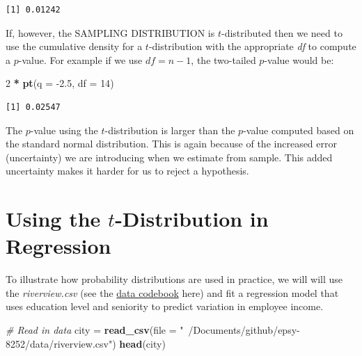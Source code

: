 \documentclass[]{book}
\newenvironment{Shaded}{\begin{snugshade}}{\end{snugshade}}
\newcommand{\CommentTok}[1]{\textcolor[rgb]{0.56,0.35,0.01}{\textit{#1}}}
\newcommand{\DataTypeTok}[1]{\textcolor[rgb]{0.13,0.29,0.53}{#1}}
\newcommand{\DecValTok}[1]{\textcolor[rgb]{0.00,0.00,0.81}{#1}}
\newcommand{\FloatTok}[1]{\textcolor[rgb]{0.00,0.00,0.81}{#1}}
\newcommand{\KeywordTok}[1]{\textcolor[rgb]{0.13,0.29,0.53}{\textbf{#1}}}
\newcommand{\NormalTok}[1]{#1}
\newcommand{\OperatorTok}[1]{\textcolor[rgb]{0.81,0.36,0.00}{\textbf{#1}}}
\newcommand{\StringTok}[1]{\textcolor[rgb]{0.31,0.60,0.02}{#1}}
\begin{document}
\begin{verbatim}
[1] 0.01242
\end{verbatim}

If, however, the SAMPLING DISTRIBUTION is \(t\)-distributed then we need to use the cumulative density for a \(t\)-distribution with the appropriate \emph{df} to compute a \(p\)-value. For example if we use \(df=n-1\), the two-tailed \(p\)-value would be:

\begin{Shaded}
\begin{Highlighting}[]
\DecValTok{2} \OperatorTok{*}\StringTok{ }\KeywordTok{pt}\NormalTok{(}\DataTypeTok{q =} \FloatTok{-2.5}\NormalTok{, }\DataTypeTok{df =} \DecValTok{14}\NormalTok{)}
\end{Highlighting}
\end{Shaded}

\begin{verbatim}
[1] 0.02547
\end{verbatim}

The \(p\)-value using the \(t\)-distribution is larger than the \(p\)-value computed based on the standard normal distribution. This is again because of the increased error (uncertainty) we are introducing when we estimate from sample. This added uncertainty makes it harder for us to reject a hypothesis.

\hypertarget{using-the-t-distribution-in-regression}{%
\section{\texorpdfstring{Using the \(t\)-Distribution in Regression}{Using the t-Distribution in Regression}}\label{using-the-t-distribution-in-regression}}

To illustrate how probability distributions are used in practice, we will will use the \emph{riverview.csv} (see the \protect\hyperlink{riverview}{data codebook} here) and fit a regression model that uses education level and seniority to predict variation in employee income.

\begin{Shaded}
\begin{Highlighting}[]
\CommentTok{# Read in data}
\NormalTok{city =}\StringTok{ }\KeywordTok{read_csv}\NormalTok{(}\DataTypeTok{file =} \StringTok{"~/Documents/github/epsy-8252/data/riverview.csv"}\NormalTok{)}
\KeywordTok{head}\NormalTok{(city)}
\end{Highlighting}
\end{Shaded}
\end{document}
